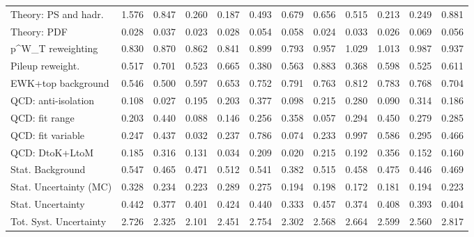 \begin{tabular}{l|p{0.6cm}p{0.6cm}p{0.6cm}p{0.6cm}p{0.6cm}p{0.6cm}p{0.6cm}p{0.6cm}p{0.6cm}p{0.6cm}p{0.6cm}}
Theory: PS and hadr.                     & 1.576 & 0.847 & 0.260 & 0.187 & 0.493 & 0.679 & 0.656 & 0.515 & 0.213 & 0.249 & 0.881 \\
Theory: PDF                              & 0.028 & 0.037 & 0.023 & 0.028 & 0.054 & 0.058 & 0.024 & 0.033 & 0.026 & 0.069 & 0.056 \\
p^{W}_{T} reweighting                    & 0.830 & 0.870 & 0.862 & 0.841 & 0.899 & 0.793 & 0.957 & 1.029 & 1.013 & 0.987 & 0.937 \\
Pileup reweight.                         & 0.517 & 0.701 & 0.523 & 0.665 & 0.380 & 0.563 & 0.883 & 0.368 & 0.598 & 0.525 & 0.611 \\
EWK+top background                       & 0.546 & 0.500 & 0.597 & 0.653 & 0.752 & 0.791 & 0.763 & 0.812 & 0.783 & 0.768 & 0.704 \\
QCD: anti-isolation                      & 0.108 & 0.027 & 0.195 & 0.203 & 0.377 & 0.098 & 0.215 & 0.280 & 0.090 & 0.314 & 0.186 \\
QCD: fit range                           & 0.203 & 0.440 & 0.088 & 0.146 & 0.256 & 0.358 & 0.057 & 0.294 & 0.450 & 0.279 & 0.285 \\
QCD: fit variable                        & 0.247 & 0.437 & 0.032 & 0.237 & 0.786 & 0.074 & 0.233 & 0.997 & 0.586 & 0.295 & 0.466 \\
QCD: DtoK+LtoM                           & 0.185 & 0.316 & 0.131 & 0.034 & 0.209 & 0.020 & 0.215 & 0.192 & 0.356 & 0.152 & 0.160 \\
Stat. Background                         & 0.547 & 0.465 & 0.471 & 0.512 & 0.541 & 0.382 & 0.515 & 0.458 & 0.475 & 0.446 & 0.469 \\
Stat. Uncertainty (MC)                   & 0.328 & 0.234 & 0.223 & 0.289 & 0.275 & 0.194 & 0.198 & 0.172 & 0.181 & 0.194 & 0.223 \\
\hline
Stat. Uncertainty                        & 0.442 & 0.377 & 0.401 & 0.424 & 0.440 & 0.333 & 0.457 & 0.374 & 0.408 & 0.393 & 0.404 \\
\hline
Tot. Syst. Uncertainty                   & 2.726 & 2.325 & 2.101 & 2.451 & 2.754 & 2.302 & 2.568 & 2.664 & 2.599 & 2.560 & 2.817 \\
\hline
\end{tabular}
